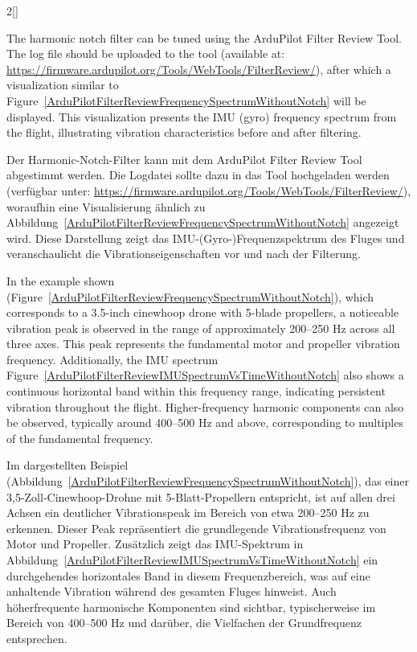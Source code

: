 \begin{paracol}{2}[]
\coleng

The harmonic notch filter can be tuned using the ArduPilot Filter Review Tool. The log file should be uploaded to the tool (available at: \url{https://firmware.ardupilot.org/Tools/WebTools/FilterReview/}), after which a visualization similar to Figure~\ref{ArduPilotFilterReviewFrequencySpectrumWithoutNotch} will be displayed. This visualization presents the IMU (gyro) frequency spectrum from the flight, illustrating vibration characteristics before and after filtering.

\colger

Der Harmonic-Notch-Filter kann mit dem ArduPilot Filter Review Tool abgestimmt werden. Die Logdatei sollte dazu in das Tool hochgeladen werden (verfügbar unter: \url{https://firmware.ardupilot.org/Tools/WebTools/FilterReview/}), woraufhin eine Visualisierung ähnlich zu Abbildung~\ref{ArduPilotFilterReviewFrequencySpectrumWithoutNotch} angezeigt wird. Diese Darstellung zeigt das IMU-(Gyro-)Frequenzspektrum des Fluges und veranschaulicht die Vibrationseigenschaften vor und nach der Filterung.

\coleng

In the example shown (Figure~\ref{ArduPilotFilterReviewFrequencySpectrumWithoutNotch}), which corresponds to a 3.5-inch cinewhoop drone with 5-blade propellers, a noticeable vibration peak is observed in the range of approximately 200–250 Hz across all three axes. This peak represents the fundamental motor and propeller vibration frequency. Additionally, the IMU spectrum Figure~\ref{ArduPilotFilterReviewIMUSpectrumVsTimeWithoutNotch} also shows a continuous horizontal band within this frequency range, indicating persistent vibration throughout the flight. Higher-frequency harmonic components can also be observed, typically around 400–500 Hz and above, corresponding to multiples of the fundamental frequency.

\colger

Im dargestellten Beispiel (Abbildung~\ref{ArduPilotFilterReviewFrequencySpectrumWithoutNotch}), das einer 3,5-Zoll-Cinewhoop-Drohne mit 5-Blatt-Propellern entspricht, ist auf allen drei Achsen ein deutlicher Vibrationspeak im Bereich von etwa 200–250 Hz zu erkennen. Dieser Peak repräsentiert die grundlegende Vibrationsfrequenz von Motor und Propeller. Zusätzlich zeigt das IMU-Spektrum in Abbildung~\ref{ArduPilotFilterReviewIMUSpectrumVsTimeWithoutNotch} ein durchgehendes horizontales Band in diesem Frequenzbereich, was auf eine anhaltende Vibration während des gesamten Fluges hinweist. Auch höherfrequente harmonische Komponenten sind sichtbar, typischerweise im Bereich von 400–500 Hz und darüber, die Vielfachen der Grundfrequenz entsprechen.


\end{paracol}
